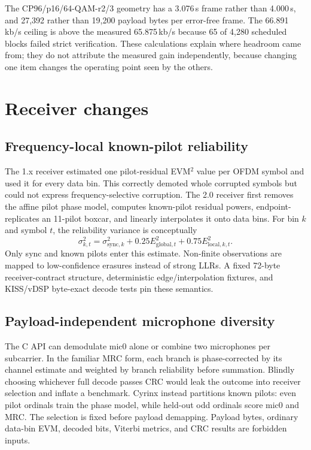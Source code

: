 \documentclass[11pt]{article}
\begin{document}
The CP96/p16/64-QAM-r2/3 geometry has a 3.076\,s frame rather than 4.000\,s,
and 27,392 rather than 19,200 payload bytes per error-free frame. The
66.891\,kb/s ceiling is above the measured 65.875\,kb/s because 65 of 4,280
scheduled blocks failed strict verification. These calculations explain where
headroom came from; they do not attribute the measured gain independently,
because changing one item changes the operating point seen by the others.

\section{Receiver changes}
\label{sec:receiver}

\subsection{Frequency-local known-pilot reliability}

The 1.x receiver estimated one pilot-residual EVM$^2$ value per OFDM symbol and
used it for every data bin. This correctly demoted whole corrupted symbols but
could not express frequency-selective corruption. The 2.0 receiver first
removes the affine pilot phase model, computes known-pilot residual powers,
endpoint-replicates an 11-pilot boxcar, and linearly interpolates it onto data
bins. For bin $k$ and symbol $t$, the reliability variance is conceptually
\begin{equation}
  \sigma^2_{k,t} = \sigma^2_{\mathrm{sync},k}
  + 0.25 E^{2}_{\mathrm{global},t}
  + 0.75 E^{2}_{\mathrm{local},k,t}.
\end{equation}
Only sync and known pilots enter this estimate. Non-finite observations are
mapped to low-confidence erasures instead of strong LLRs. A fixed 72-byte
receiver-contract structure, deterministic edge/interpolation fixtures, and
KISS/vDSP byte-exact decode tests pin these semantics.

\subsection{Payload-independent microphone diversity}

The C API can demodulate mic0 alone or combine two microphones per
subcarrier. In the familiar MRC form, each branch is phase-corrected by its
channel estimate and weighted by branch reliability before summation. Blindly
choosing whichever full decode passes CRC would leak the outcome into receiver
selection and inflate a benchmark. Cyrinx instead partitions known pilots:
even pilot ordinals train the phase model, while held-out odd ordinals score
mic0 and MRC. The selection is fixed before payload demapping. Payload bytes,
ordinary data-bin EVM, decoded bits, Viterbi metrics, and CRC results are
forbidden inputs.
\end{document}
